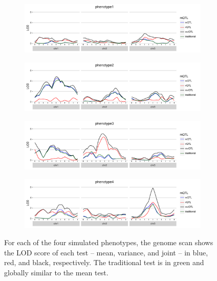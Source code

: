 \documentclass[9pt,twocolumn,twoside]{gsag3jnl}
\begin{document}
\begin{figure}
    \begin{subfigure}{0.5\textwidth}
        \includegraphics[width=\textwidth]{images/LOD_scan_phenotype1.pdf}
    \end{subfigure}

    \begin{subfigure}[b]{0.5\textwidth}
        \includegraphics[width=\textwidth]{images/LOD_scan_phenotype2.pdf}
    \end{subfigure}

    \begin{subfigure}[b]{0.5\textwidth}
        \includegraphics[width=\textwidth]{images/LOD_scan_phenotype3.pdf}
    \end{subfigure}
    
    \begin{subfigure}[b]{0.5\textwidth}
        \includegraphics[width=\textwidth]{images/LOD_scan_phenotype4.pdf}
    \end{subfigure}
    
    \caption{For each of the four simulated phenotypes, the genome scan shows the LOD score of each test -- mean, variance, and joint -- in blue, red, and black, respectively.  The traditional test is in green and globally similar to the mean test. \label{fig:lod_score_scans}}
\end{figure}
\end{document}
